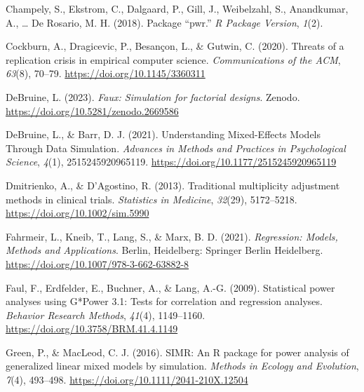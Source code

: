 \documentclass[
  man,floatsintext]{apa6}
\newlength{\cslhangindent}
\newlength{\cslentryspacingunit} %
\newenvironment{CSLReferences}[2] %
 {%
  \setlength{\parindent}{0pt}
  \ifodd #1
  \let\oldpar\par
  \def\par{\hangindent=\cslhangindent\oldpar}
  \fi
  \setlength{\parskip}{#2\cslentryspacingunit}
 }%
 {}
\begin{document}
\begin{CSLReferences}{1}{0}
\leavevmode{}%
Champely, S., Ekstrom, C., Dalgaard, P., Gill, J., Weibelzahl, S., Anandkumar, A., \ldots{} De Rosario, M. H. (2018). Package {``pwr.''} \emph{R Package Version}, \emph{1}(2).

\leavevmode{}%
Cockburn, A., Dragicevic, P., Besançon, L., \& Gutwin, C. (2020). Threats of a replication crisis in empirical computer science. \emph{Communications of the ACM}, \emph{63}(8), 70--79. \url{https://doi.org/10.1145/3360311}

\leavevmode{}%
DeBruine, L. (2023). \emph{Faux: Simulation for factorial designs}. Zenodo. \url{https://doi.org/10.5281/zenodo.2669586}

\leavevmode{}%
DeBruine, L., \& Barr, D. J. (2021). Understanding {Mixed-Effects Models Through Data Simulation}. \emph{Advances in Methods and Practices in Psychological Science}, \emph{4}(1), 2515245920965119. \url{https://doi.org/10.1177/2515245920965119}

\leavevmode{}%
Dmitrienko, A., \& D'Agostino, R. (2013). Traditional multiplicity adjustment methods in clinical trials. \emph{Statistics in Medicine}, \emph{32}(29), 5172--5218. \url{https://doi.org/10.1002/sim.5990}

\leavevmode{}%
Fahrmeir, L., Kneib, T., Lang, S., \& Marx, B. D. (2021). \emph{Regression: {Models}, {Methods} and {Applications}}. {Berlin, Heidelberg}: {Springer Berlin Heidelberg}. \url{https://doi.org/10.1007/978-3-662-63882-8}

\leavevmode{}%
Faul, F., Erdfelder, E., Buchner, A., \& Lang, A.-G. (2009). Statistical power analyses using {G}*{Power} 3.1: {Tests} for correlation and regression analyses. \emph{Behavior Research Methods}, \emph{41}(4), 1149--1160. \url{https://doi.org/10.3758/BRM.41.4.1149}

\leavevmode{}%
Green, P., \& MacLeod, C. J. (2016). {SIMR}: An {R} package for power analysis of generalized linear mixed models by simulation. \emph{Methods in Ecology and Evolution}, \emph{7}(4), 493--498. \url{https://doi.org/10.1111/2041-210X.12504}


\end{CSLReferences}
\end{document}
